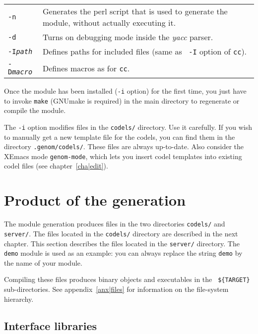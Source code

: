 \begin{description}
\begin{tabularx}{\linewidth}{lX}
{\tt -n} & Generates the perl script that is used to generate the module,
without actually executing it.\\

{\tt -d} & Turns on debugging mode inside the {\em yacc} parser.\\

{\tt -I{\em path}} & Defines paths for included files (same as {\tt
-I} option of {\tt cc}).\\

{\tt -D{\em macro}} & Defines macros as for {\tt cc}.\\
\end{tabularx}

Once the module has been installed ({\tt -i} option)  for the first time,
you just   have to invoke {\tt make}   (GNUmake is required)  in the main
directory to regenerate or compile the module.

The {\tt -i} option modifies files in the {\tt codels/} directory. Use it
carefully.  If you wish  to manually  get a  new   template file for  the
codels, you can find them in the directory {\tt .genom/codels/}.  These files
are always  up-to-date. Also consider the  XEmacs  mode {\tt genom-mode},
which lets  you  insert codel templates  into  existing codel files  (see
chapter~\ref{cha|edit}).

\end{description}


\section{Product of the generation}

The module generation produces files in the two directories {\tt codels/}
and {\tt server/}.  The files located  in the  {\tt codels/}  directory are
described in the next chapter.  This  section describes the files located
in  the  {\tt server/} directory.   The {\tt  demo} module   is  used as an
example: you can always replace the string {\tt demo} by the name of your
module.

Compiling these files produces binary objects and executables in the {\tt
\$\{TARGET\}} sub-\-directories. See appendix~\ref{anx|files} for
information on the file-system hierarchy.

\subsection{Interface libraries}

